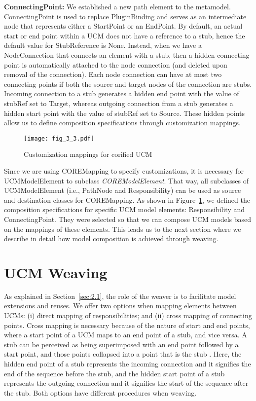 \textbf{\cls ConnectingPoint:} We established a new path element to the metamodel. {\cls ConnectingPoint} is used to replace {\cls PluginBinding} and serves as an intermediate node that represents either a {\cls StartPoint} or an {\cls EndPoint}. By default, an actual start or end point within a UCM does not have a reference to a stub, hence the default value for {\cls StubReference} is {\cls None}. Instead, when we have a {\cls NodeConnection} that connects an element with a stub, then a hidden connecting point is automatically attached to the node connection (and deleted upon removal of the connection). Each node connection can have at most two connecting points if both the source and target nodes of the connection are stubs. Incoming connection to a stub generates a hidden end point with the value of {\cls stubRef} set to {\cls Target}, whereas outgoing connection from a stub generates a hidden start point with the value of {\cls stubRef} set to {\cls Source}. These hidden points allow us to define composition specifications through customization mappings.

\begin{figure}
	\centering
	\texttt{[image: fig\_3\_3.pdf]}
	\caption{Customization mappings for corified UCM}
	\label{fig:3.3}
\end{figure}

Since we are using {\cls COREMapping} to specify customizations, it is necessary for {\cls UCMModelElement} to subclass \emph{\cls COREModelElement}. That way, all subclasses of {\cls UCMModelElement} (i.e., {\cls PathNode} and {\cls Responsibility}) can be used as source and destination classes for {\cls COREMapping}. As shown in Figure~\ref{fig:3.3}, we defined the composition specifications for specific UCM model elements: {\cls Responsibility} and {\cls ConnectingPoint}. They were selected so that we can compose UCM models based on the mappings of these elements. This leads us to the next section where we describe in detail how model composition is achieved through weaving.

\section{UCM Weaving} \label{sec:3.2}

As explained in Section~\ref{sec:2.1}, the role of the weaver is to facilitate model extensions and reuses. We offer two options when mapping elements between UCMs: (i) direct mapping of responsibilities; and (ii) cross mapping of connecting points. Cross mapping is necessary because of the nature of start and end points, where a start point of a UCM maps to an end point of a stub, and vice versa. A stub can be perceived as being superimposed with an end point followed by a start point, and those points collapsed into a point that is the stub \cite{buhr1995use}. Here, the hidden end point of a stub represents the incoming connection and it signifies the end of the sequence before the stub, and the hidden start point of a stub represents the outgoing connection and it signifies the start of the sequence after the stub. Both options have different procedures when weaving.

